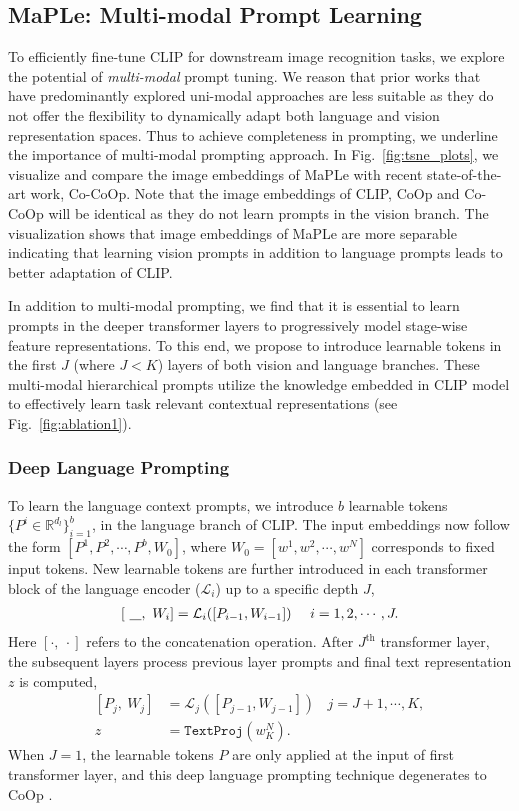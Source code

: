 \documentclass[10pt,twocolumn,letterpaper]{article}
\begin{document}
\subsection{MaPLe: \textbf{M}ulti-mod\textbf{a}l \textbf{P}rompt \textbf{Le}arning}
\noindent To efficiently fine-tune CLIP for downstream image recognition tasks, we explore the potential of \textit{multi-modal} prompt tuning.
We reason that prior works that have predominantly explored uni-modal approaches are less suitable as they do not offer the flexibility to dynamically adapt both language and vision representation spaces. Thus to achieve completeness in prompting, we underline the importance of multi-modal prompting approach. In Fig.~\ref{fig:tsne_plots}, we visualize and compare the image embeddings of MaPLe with recent state-of-the-art work, Co-CoOp. Note that the image embeddings of CLIP, CoOp and Co-CoOp will be identical as they do not learn prompts in the vision branch. The visualization shows that image embeddings of MaPLe are more separable indicating that learning vision prompts in addition to language prompts leads to better adaptation of CLIP.

In addition to multi-modal prompting, we find that it is essential to learn prompts in the deeper transformer layers to progressively model stage-wise feature representations. To this end, we propose to introduce learnable tokens in the first $J$ (where $J < K$) layers of both vision and language branches. These multi-modal hierarchical prompts utilize the knowledge embedded in CLIP model to effectively learn task relevant contextual representations (see Fig.~\ref{fig:ablation1}).

\subsubsection{Deep Language Prompting}
To learn the language context prompts, we introduce $b$ learnable tokens $\{P^i \in \mathbb{R}^{d_l}\}_{i=1}^b$, in the language branch of CLIP. The input embeddings now follow the form $[P^1, P^2, \cdots, P^b, W_{0}]$, where $W_{0}=[w^{1}, w^{2}, \cdots, w^{N}]$ corresponds to fixed input tokens. New learnable tokens are further introduced in each transformer block of the language encoder ($\mathcal{L}_{i}$) up to a specific depth $J$,
\begin{align}
\label{eq:1}
[\ \underline{\hspace{0.3cm}}, \ W_{i}] = \mathcal{L}_{i}([P_{i-1}, W_{i-1}]) ~~~~ i=1, 2, \cdots, J.
\end{align}
Here $[\cdot,~\cdot]$  refers to the concatenation operation. After $J^{\text{th}}$ transformer layer, the subsequent layers process previous layer prompts and final text representation $z$ is computed,
\begin{align}
\label{eq:2}
[P_{j}, \ W_{j}] &= \mathcal{L}_{j}([P_{j-1}, W_{j-1}]) ~~~~ j=J+1, \cdots, K, \\
z &= \texttt{TextProj}(w_{K}^{N}). \label{eq:3}
\end{align}
When $J=1$, the learnable tokens $P$ are only applied at the input of first transformer layer, and this deep language prompting technique degenerates to CoOp \cite{zhou2022learning}. 
\end{document}
